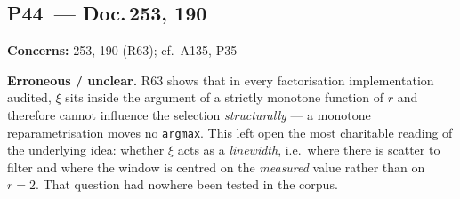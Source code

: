 \medskip

\subsection*{P44~--- Doc.\,253, 190}

\noindent\textbf{Concerns:} 253, 190 (R63); cf.\ A135, P35

\smallskip\noindent\textbf{Erroneous / unclear.}\quad
R63 shows that in every factorisation implementation audited, $\xi$ sits
inside the argument of a strictly monotone function of $r$ and therefore
cannot influence the selection \emph{structurally} --- a monotone
reparametrisation moves no \texttt{argmax}. This left open the most
charitable reading of the underlying idea: whether $\xi$ acts as a
\emph{linewidth}, i.e.\ where there is scatter to filter and where the
window is centred on the \emph{measured} value rather than on $r = 2$.
That question had nowhere been tested in the corpus.

